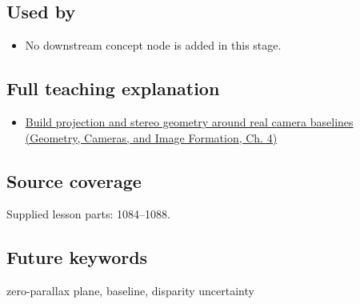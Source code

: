 \subsection{Used by}\label{appendix-0976e86e5b9f-used-by}

\begin{itemize}
\tightlist
\item
  No downstream concept node is added in this stage.
\end{itemize}

\subsection{Full teaching explanation}\label{appendix-0976e86e5b9f-full-teaching-explanation}

\begin{itemize}
\tightlist
\item
  \href{../03-Geometry-Cameras-and-Image-Formation/main.pdf\#nameddest=02-foundations-ii-ch035-build-projection-and-stereo-geometry-around-real-camera-baselines}{Build projection and stereo geometry around real camera baselines (Geometry, Cameras, and Image Formation, Ch. 4)}
\end{itemize}

\subsection{Source coverage}\label{appendix-0976e86e5b9f-source-coverage}

Supplied lesson parts: 1084--1088.

\subsection{Future keywords}\label{appendix-0976e86e5b9f-future-keywords}

zero-parallax plane, baseline, disparity uncertainty
